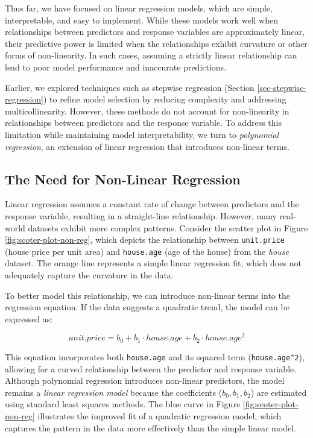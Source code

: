\documentclass[
  11pt,
]{book}
\theoremstyle{definition}
\theoremstyle{definition}
\theoremstyle{definition}
\theoremstyle{definition}
\theoremstyle{remark}
\begin{document}
Thus far, we have focused on linear regression models, which are simple, interpretable, and easy to implement. While these models work well when relationships between predictors and response variables are approximately linear, their predictive power is limited when the relationships exhibit curvature or other forms of non-linearity. In such cases, assuming a strictly linear relationship can lead to poor model performance and inaccurate predictions.

Earlier, we explored techniques such as stepwise regression (Section \ref{sec-stepwise-regression}) to refine model selection by reducing complexity and addressing multicollinearity. However, these methods do not account for non-linearity in relationships between predictors and the response variable. To address this limitation while maintaining model interpretability, we turn to \emph{polynomial regression}, an extension of linear regression that introduces non-linear terms.

\subsection*{The Need for Non-Linear Regression}\label{the-need-for-non-linear-regression}


Linear regression assumes a constant rate of change between predictors and the response variable, resulting in a straight-line relationship. However, many real-world datasets exhibit more complex patterns. Consider the scatter plot in Figure \ref{fig:scoter-plot-non-reg}, which depicts the relationship between \texttt{unit.price} (house price per unit area) and \texttt{house.age} (age of the house) from the \emph{house} dataset. The orange line represents a simple linear regression fit, which does not adequately capture the curvature in the data.

To better model this relationship, we can introduce non-linear terms into the regression equation. If the data suggests a quadratic trend, the model can be expressed as:

\[
unit.price = b_0 + b_1 \cdot house.age + b_2 \cdot house.age^2
\]

This equation incorporates both \texttt{house.age} and its squared term (\texttt{house.age\^{}2}), allowing for a curved relationship between the predictor and response variable. Although polynomial regression introduces non-linear predictors, the model remains a \emph{linear regression model} because the coefficients (\(b_0, b_1, b_2\)) are estimated using standard least squares methods. The blue curve in Figure \ref{fig:scoter-plot-non-reg} illustrates the improved fit of a quadratic regression model, which captures the pattern in the data more effectively than the simple linear model.
\end{document}
